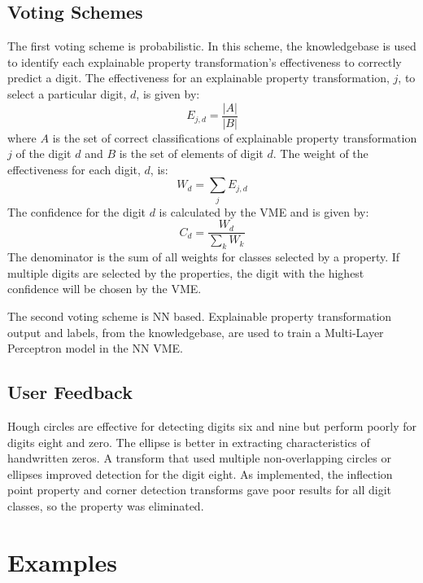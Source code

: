 \documentclass[conference]{IEEEtran}
\begin{document}
\subsection{Voting Schemes}
\label{subsection:Voting}

The first voting scheme is probabilistic.  In this scheme, the knowledgebase is
used to identify each explainable property transformation's effectiveness to
correctly predict a digit.   The effectiveness for an explainable property
transformation, $j$, to select a particular digit, $d$,  is given by:
\begin{equation}\label{effectiveness}
E_{j,d}  = \frac{|A|}{|B|}
\end{equation}
where $A$ is the set of correct classifications of explainable property
transformation $j$ of the digit $d$ and $B$ is the set of elements of digit $d$.
The weight of the effectiveness for each digit, $d$, is:
\begin{equation}\label{weight}
W_d=\sum_j E_{j, d}
\end{equation}
The confidence for the digit $d$ is calculated by the VME and is given by:
\begin{equation}\label{conf}
C_d=\frac{W_d}{\sum\limits_kW_k}
\end{equation}
The denominator is the sum of all weights for classes selected by a property.
If multiple digits are selected by the properties, the digit with the highest
confidence will be chosen by the VME.

The second voting scheme is NN based.  Explainable property transformation
output and labels, from the knowledgebase, are used to train a Multi-Layer
Perceptron model in the NN VME.

\subsection{ User Feedback}

Hough circles are effective for detecting digits six and nine but perform poorly
for digits eight and zero.  The ellipse is better in extracting characteristics
of handwritten zeros.   A transform that used multiple non-overlapping circles
or ellipses improved detection for the digit eight.  As implemented, the
inflection point property and corner detection transforms gave poor results for
all digit classes, so the property was eliminated.

\section{Examples}
\end{document}

